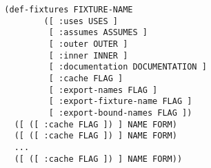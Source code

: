 \begin{verbatim}
  (def-fixtures FIXTURE-NAME
          ([ :uses USES ]
           [ :assumes ASSUMES ]
           [ :outer OUTER ]
           [ :inner INNER ]
           [ :documentation DOCUMENTATION ]
           [ :cache FLAG ]
           [ :export-names FLAG ]
           [ :export-fixture-name FLAG ]
           [ :export-bound-names FLAG ])
    ([ ([ :cache FLAG ]) ] NAME FORM)
    ([ ([ :cache FLAG ]) ] NAME FORM)
    ...
    ([ ([ :cache FLAG ]) ] NAME FORM))
\end{verbatim}

